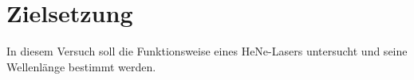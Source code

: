 \section{Zielsetzung}
\label{sec:Zielsetzung}

In diesem Versuch soll die Funktionsweise eines HeNe-Lasers untersucht und seine Wellenlänge bestimmt werden.